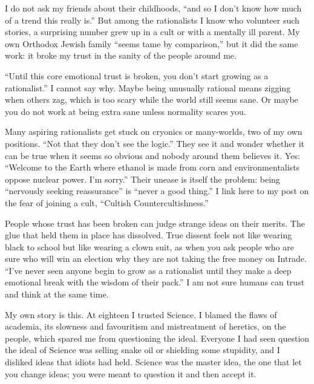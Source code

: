 
I do not ask my friends about their childhoods, ``and so I don't know how much of a trend this really is.'' But among the rationalists I know who volunteer such stories, a surprising number grew up in a cult or with a mentally ill parent. My own Orthodox Jewish family ``seems tame by comparison,'' but it did the same work: it broke my trust in the sanity of the people around me.

``Until this core emotional trust is broken, you don't start growing as a rationalist.'' I cannot say why. Maybe being unusually rational means zigging when others zag, which is too scary while the world still seems sane. Or maybe you do not work at being extra sane unless normality scares you. 

Many aspiring rationalists get stuck on cryonics or many-worlds, two of my own positions. ``Not that they don't see the logic.'' They see it and wonder whether it can be true when it seems so obvious and nobody around them believes it. Yes: ``Welcome to the Earth where ethanol is made from corn and environmentalists oppose nuclear power. I'm sorry.''  Their unease is itself the problem: being ``nervously seeking reassurance'' is ``never a good thing.'' I link here to my post on the fear of joining a cult, ``Cultish Countercultishness.''

People whose trust has been broken can judge strange ideas on their merits. The glue that held them in place has dissolved. True dissent feels not like wearing black to school but like wearing a clown suit, as when you ask people who are sure who will win an election why they are not taking the free money on Intrade.  ``I've never seen anyone begin to grow as a rationalist until they make a deep emotional break with the wisdom of their pack.'' I am not sure humans can trust and think at the same time.

My own story is this. At eighteen I trusted Science. I blamed the flaws of academia, its slowness and favouritism and mistreatment of heretics, on the people, which spared me from questioning the ideal. Everyone I had seen question the ideal of Science was selling snake oil or shielding some stupidity, and I disliked ideas that idiots had held. Science was the master idea, the one that let you change ideas; you were meant to question it and then accept it.

